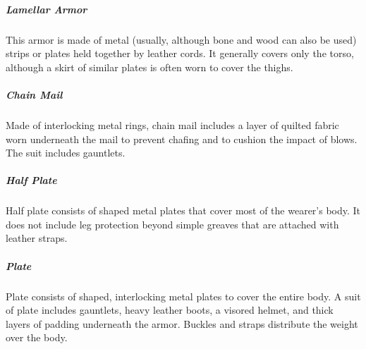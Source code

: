 \subparagraph*{Lamellar Armor} This armor is made of metal (usually, although bone and wood can also be used) strips or plates held together by leather cords. It generally covers only the torso, although a skirt of similar plates is often worn to cover the thighs.

\subparagraph*{Chain Mail} Made of interlocking metal rings, chain mail includes a layer of quilted fabric worn underneath the mail to prevent chafing and to cushion the impact of blows. The suit includes gauntlets.

\subparagraph*{Half Plate} Half plate consists of shaped metal plates that cover most of the wearer's body. It does not include leg protection beyond simple greaves that are attached with leather straps.

\subparagraph*{Plate} Plate consists of shaped, interlocking metal plates to cover the entire body. A suit of plate includes gauntlets, heavy leather boots, a visored helmet, and thick layers of padding underneath the armor. Buckles and straps distribute the weight over the body.


